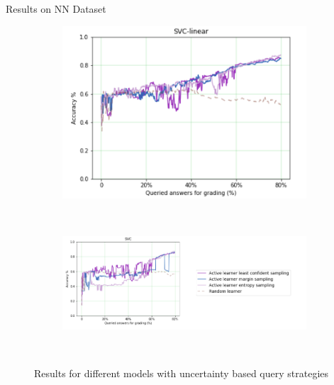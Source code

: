 \documentclass{beamer}
\begin{document}
\begin{frame}{Results on NN Dataset}
\begin{figure}[!htb]
			\begin{subfigure}[b]{0.32\textwidth}
				\includegraphics[width=\textwidth]{images/t3}
				\label{mohlergrades}
			\end{subfigure}
			~
			\begin{subfigure}[b]{0.58\textwidth}
				\includegraphics[width=\textwidth]{images/t4}
				\label{mohlerdisagreement}
			\end{subfigure}
			~
			\caption{Results for different models with uncertainty based query strategies}
		\end{figure}
\end{frame}
\end{document}
